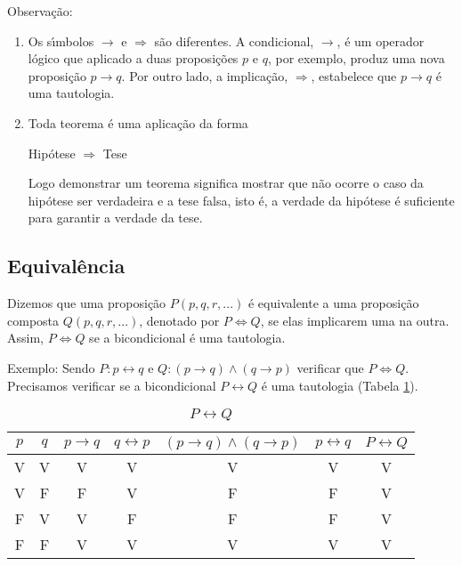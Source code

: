 Observa{\c c}{\~a}o:
\begin{enumerate}
\item Os s{\'\i}mbolos $\rightarrow$ e $\Rightarrow$ s{\~a}o diferentes. A condicional, $\rightarrow$, {\'e} um operador l{\'o}gico que aplicado a duas proposi{\c c}{\~o}es $p$ e $q$, por exemplo, produz uma nova proposi{\c c}{\~a}o $p\rightarrow q$. Por outro lado, a implica{\c c}{\~a}o, $\Rightarrow$, estabelece que $p\rightarrow q$ {\'e} uma tautologia.
\item Toda teorema {\'e} uma aplica{\c c}{\~a}o da forma
\begin{center}
Hip{\'o}tese $\Rightarrow$ Tese
\end{center}

Logo demonstrar um teorema significa mostrar que n{\~a}o ocorre o caso da hip{\'o}tese ser verdadeira e a tese falsa, isto {\'e}, a verdade da hip{\'o}tese {\'e} suficiente para garantir a verdade da tese.
\end{enumerate}

\subsection{Equival{\^e}ncia}

\begin{definicao} Dizemos que uma proposi{\c c}{\~a}o $P(p,q,r,...)$ {\'e} equivalente a uma proposi{\c c}{\~a}o composta $Q(p,q,r,...)$, denotado por $P\Leftrightarrow Q$, se elas implicarem uma na outra. Assim, $P\Leftrightarrow Q$ se a bicondicional {\'e} uma tautologia.\end{definicao}

Exemplo: Sendo $P:p\leftrightarrow q$ e $Q:(p\rightarrow q)\wedge(q\rightarrow p)$ verificar que $P\Leftrightarrow Q$.\\

Precisamos verificar se a bicondicional $P\leftrightarrow Q$ {\'e} uma tautologia (Tabela \ref{4}).
\begin{table}[h]
   \centering 
   \setlength{\arrayrulewidth}{0,5\arrayrulewidth}
   \caption{\it $P\leftrightarrow Q$}
   \begin{tabular}{|c|c|c|c|c|c|c|} 
      \hline
      $p$ & $q$ & $p\rightarrow q$ & $q\leftrightarrow p$ & $(p\rightarrow q)\wedge(q\rightarrow p)$ & $p\leftrightarrow q$ & $P\leftrightarrow Q$ \\
     \hline
      V & V & V & V & V & V & V \\
      \hline
      V & F & F & V & F & F & V\\
      \hline
      F & V & V & F & F & F & V \\
      \hline
      F & F & V & V & V & V & V \\
      \hline
   \end{tabular}
\label{4}
\end{table}